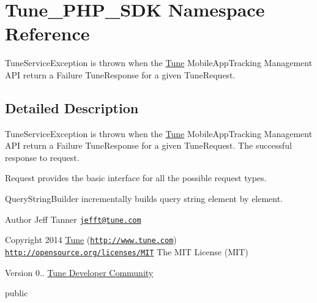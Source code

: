 \hypertarget{namespaceTune__PHP__SDK}{\section{Tune\-\_\-\-P\-H\-P\-\_\-\-S\-D\-K Namespace Reference}
\label{namespaceTune__PHP__SDK}
}


Tune\-Service\-Exception is thrown when the \hyperlink{namespaceTune}{Tune} Mobile\-App\-Tracking Management A\-P\-I return a Failure Tune\-Response for a given Tune\-Request.  




\subsection{Detailed Description}
Tune\-Service\-Exception is thrown when the \hyperlink{namespaceTune}{Tune} Mobile\-App\-Tracking Management A\-P\-I return a Failure Tune\-Response for a given Tune\-Request. The successful response to request.

Request provides the basic interface for all the possible request types.

Query\-String\-Builder incrementally builds query string element by element.

\begin{DoxyAuthor}{Author}
Jeff Tanner \href{mailto:jefft@tune.com}{\tt jefft@tune.\-com} 
\end{DoxyAuthor}
\begin{DoxyCopyright}{Copyright}
2014 \hyperlink{namespaceTune}{Tune} (\href{http://www.tune.com}{\tt http\-://www.\-tune.\-com})  \href{http://opensource.org/licenses/MIT}{\tt http\-://opensource.\-org/licenses/\-M\-I\-T} The M\-I\-T License (M\-I\-T) 
\end{DoxyCopyright}
\begin{DoxyVersion}{Version}
0.. \hyperlink{}{Tune Developer Community }
\end{DoxyVersion}
public 